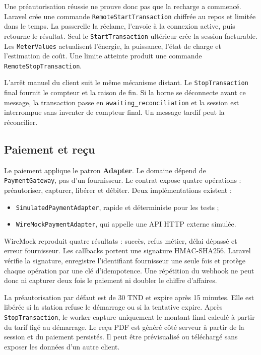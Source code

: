 Une préautorisation réussie ne prouve donc pas que la recharge a commencé. Laravel
crée une commande \texttt{RemoteStartTransaction} chiffrée au repos et limitée dans
le temps. La passerelle la réclame, l'envoie à la connexion active, puis retourne le
résultat. Seul le \texttt{StartTransaction} ultérieur crée la session facturable.
Les \texttt{MeterValues} actualisent l'énergie, la puissance, l'état de charge et
l'estimation de coût. Une limite atteinte produit une commande
\texttt{RemoteStopTransaction}.

L'arrêt manuel du client suit le même mécanisme distant. Le
\texttt{StopTransaction} final fournit le compteur et la raison de fin. Si la borne
se déconnecte avant ce message, la transaction passe en
\texttt{awaiting\_reconciliation} et la session est interrompue sans inventer de
compteur final. Un message tardif peut la réconcilier.

\subsection{Paiement et reçu}

Le paiement applique le patron \textbf{Adapter}. Le domaine dépend de
\texttt{PaymentGateway}, pas d'un fournisseur. Le contrat expose quatre opérations :
préautoriser, capturer, libérer et débiter. Deux implémentations existent :

\begin{itemize}[leftmargin=7mm]
  \item \texttt{SimulatedPaymentAdapter}, rapide et déterministe pour les tests ;
  \item \texttt{WireMockPaymentAdapter}, qui appelle une API HTTP externe simulée.
\end{itemize}

WireMock reproduit quatre résultats : succès, refus métier, délai dépassé et erreur
fournisseur. Les callbacks portent une signature HMAC-SHA256. Laravel vérifie la
signature, enregistre l'identifiant fournisseur une seule fois et protège chaque
opération par une clé d'idempotence. Une répétition du webhook ne peut donc ni
capturer deux fois le paiement ni doubler le chiffre d'affaires.

La préautorisation par défaut est de 30 TND et expire après 15 minutes. Elle est
libérée si la station refuse le démarrage ou si la tentative expire. Après
\texttt{StopTransaction}, le worker capture uniquement le montant final calculé à
partir du tarif figé au démarrage. Le reçu PDF est généré côté serveur à partir de
la session et du paiement persistés. Il peut être prévisualisé ou téléchargé sans
exposer les données d'un autre client.

